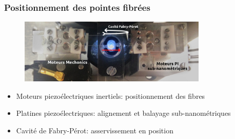 \documentclass[9pt,a9paper,handout]{beamer}
\begin{document}
    \begin{frame}
        \frametitle{Positionnement des pointes fibrées}
        \begin{figure}\centering
            \includegraphics[width=0.8\textwidth]{Images/photo_experience}
        \end{figure}
        \begin{itemize}
            \item Moteurs piezoélectriques inertiels: positionnement des fibres
            \item Platines piezoélectriques: alignement et balayage sub-nanométriques
        \vspace*{2mm}
            \item Cavité de Fabry-Pérot: asservissement en position
        \end{itemize}
        \vspace*{3mm}
        \begin{minipage}{\textwidth}
            \centering
            \hspace*{3mm}
        \end{minipage}
    \end{frame}
\end{document}
